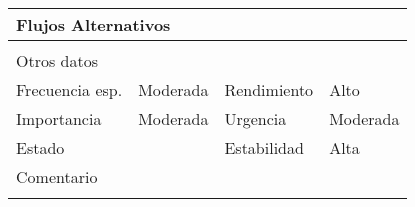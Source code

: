 \documentclass{article}
\begin{document}
\begin{table}[h]
\begin{tabular}{|l|l|l|l|l|l|}
\hline
\multicolumn{6}{|p{10cm}|}{Flujos Alternativos}\\
\hline
\multicolumn{1}{|p{1cm}}{} & \multicolumn{5}{|p{9cm}|}{}\\
\hline
\multicolumn{6}{|p{10cm}|}{Otros datos}\\
\hline
\multicolumn{1}{|p{2cm}|}{Frecuencia esp.} & \multicolumn{2}{p{3cm}}{Moderada} & \multicolumn{1}{|p{2cm}|}{Rendimiento} & \multicolumn{2}{p{3cm}|}{Alto}\\
\hline
\multicolumn{1}{|p{2cm}|}{Importancia} & \multicolumn{2}{p{3cm}}{Moderada} & \multicolumn{1}{|p{2cm}|}{Urgencia} & \multicolumn{2}{p{3cm}|}{Moderada}\\
\hline
\multicolumn{1}{|p{2cm}|}{Estado} & \multicolumn{2}{p{3cm}}{} & \multicolumn{1}{|p{2cm}|}{Estabilidad} & \multicolumn{2}{p{3cm}|}{Alta}\\
\hline
\multicolumn{6}{|p{10cm}|}{Comentario}\\
\hline
\multicolumn{6}{|p{10cm}|}{}\\
\hline
\end{tabular}
\end{table}
\addtocounter{ni}{1}
\clearpage
\end{document}
